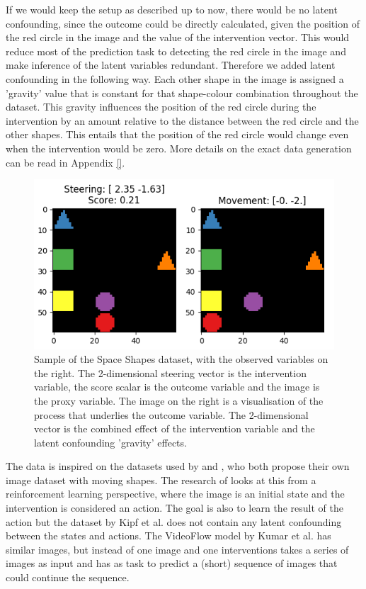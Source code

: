 \documentclass{report}
\begin{document}
If we would keep the setup as described up to now, there would be no latent confounding, since the outcome could be directly calculated, given the position of the red circle in the image and the value of the intervention vector. This would reduce most of the prediction task to detecting the red circle in the image and make inference of the latent variables redundant. Therefore we added latent confounding in the following way. Each other shape in the image is assigned a 'gravity' value that is constant for that shape-colour combination throughout the dataset. This gravity influences the position of the red circle during the intervention by an amount relative to the distance between the red circle and the other shapes. This entails that the position of the red circle would change even when the intervention would be zero. More details on the exact data generation can be read in Appendix \ref{}.

\begin{figure}
    \centering
    \includegraphics{latex/Images/sample_space_shapes_score_left.png}
    \caption{Sample of the Space Shapes dataset, with the observed variables on the right. The 2-dimensional steering vector is the intervention variable, the score scalar is the outcome variable and the image is the proxy variable. The image on the right is a visualisation of the process that underlies the outcome variable. The 2-dimensional vector is the combined effect of the intervention variable and the latent confounding 
   'gravity' effects.}
    \label{fig:space_shapes_sample}
\end{figure}

The data is inspired on the datasets used by \cite{kipf2019contrastive} and \cite{kumar2019videoflow}, who both propose their own image dataset with moving shapes. The research of \cite{kipf2019contrastive} looks at this from a reinforcement learning perspective, where the image is an initial state and the intervention is considered an action. The goal is also to learn the result of the action but the dataset by Kipf et al. does not contain any latent confounding between the states and actions. The VideoFlow model by Kumar et al. has similar images, but instead of one image and one interventions takes a series of images as input and has as task to predict a (short) sequence of images that could continue the sequence.
\end{document}
